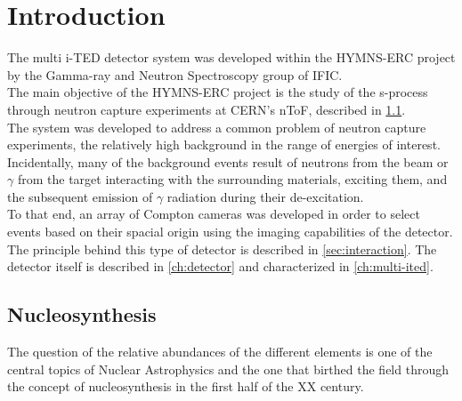 \chapter{Introduction}\label{ch:background}

The multi \ac{i-TED} detector system was developed within the \ac{HYMNS}-\ac{ERC} project by the Gamma-ray and Neutron Spectroscopy group of \ac{IFIC}.\\

The main objective of the \ac{HYMNS}-\ac{ERC} project is the study of the s-process through neutron capture experiments at \ac{CERN}'s \ac{nToF}, described in \ref{sec:nucleosynthesis}.\\

The system was developed to address a common problem of neutron capture experiments, the relatively high background in the range of energies of interest. Incidentally, many of the background events result of neutrons from the beam or $\gamma$ from the target interacting with the surrounding materials, exciting them, and the subsequent emission of $\gamma$ radiation during their de-excitation.\\

To that end, an array of Compton cameras was developed in order to select events based on their spacial origin using the imaging capabilities of the detector. The principle behind this type of detector is described in \ref{sec:interaction}. The detector itself is described in \ref{ch:detector} and characterized in \ref{ch:multi-ited}.\\

\section{Nucleosynthesis}\label{sec:nucleosynthesis}

The question of the relative abundances of the different elements is one of the central topics of Nuclear Astrophysics and the one that birthed the field through the concept of nucleosynthesis in the first half of the XX century.

